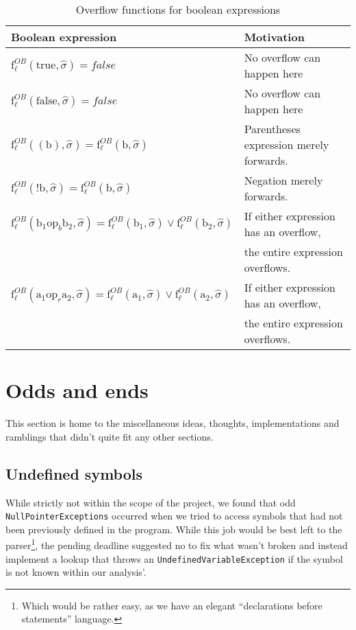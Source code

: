 \begin{table}[h]
\begin{tabular}{| l | l |}
  \hline
  Boolean expression & Motivation\\
  \hline
  \hline
  $\text{f}_\ell^{OB} (\text{true},\widehat{\sigma}) = false $ & No overflow can happen here\\ 
  \hline
  $\text{f}_\ell^{OB} (\text{false},\widehat{\sigma}) = false $ & No overflow can happen here\\ 
  \hline
  $\text{f}_\ell^{OB} ((\text{b}),\widehat{\sigma}) = \text{f}_\ell^{OB} (\text{b}, \widehat{\sigma}) $ & Parentheses expression merely forwards.\\ 
  \hline
    $\text{f}_\ell^{OB} (\text{!b},\widehat{\sigma}) = \text{f}_\ell^{OB} (\text{b}, \widehat{\sigma}) $ & Negation merely forwards.\\ 
  \hline
   $\text{f}_\ell^{OB} (\text{b}_1 \text{op}_b \text{b}_2, \widehat{\sigma}) = \text{f}_\ell^{OB} (\text{b}_1, \widehat{\sigma}) \vee \text{f}_\ell^{OB} (\text{b}_2, \widehat{\sigma})$ & If either expression has an overflow,\\
                                & the entire expression overflows.\\   
  \hline
     $\text{f}_\ell^{OB} (\text{a}_1 \text{op}_r \text{a}_2, \widehat{\sigma}) = \text{f}_\ell^{OB} (\text{a}_1, \widehat{\sigma}) \vee \text{f}_\ell^{OB} (\text{a}_2, \widehat{\sigma})$ & If either expression has an overflow,\\
                                & the entire expression overflows.\\   
  \hline
\end{tabular}
\centering
\caption{Overflow functions for boolean expressions}
\label{table:overflow_functions_boolean_expressions}
\end{table}


\section{Odds and ends}
This section is home to the miscellaneous ideas, thoughts, implementations and ramblings that didn't quite fit any other sections.

\subsection{Undefined symbols}
While strictly not within the scope of the project, we found that odd \texttt{NullPointerExceptions} occurred when we tried to access symbols that had not been previously defined in the program. While this job would be best left to the parser\footnote{Which would be rather easy, as we have an elegant ``declarations before statements'' language.}, the pending deadline suggested no to fix what wasn't broken and instead implement a lookup that throws an \texttt{UndefinedVariableException} if the symbol is not known within our analysis'.

